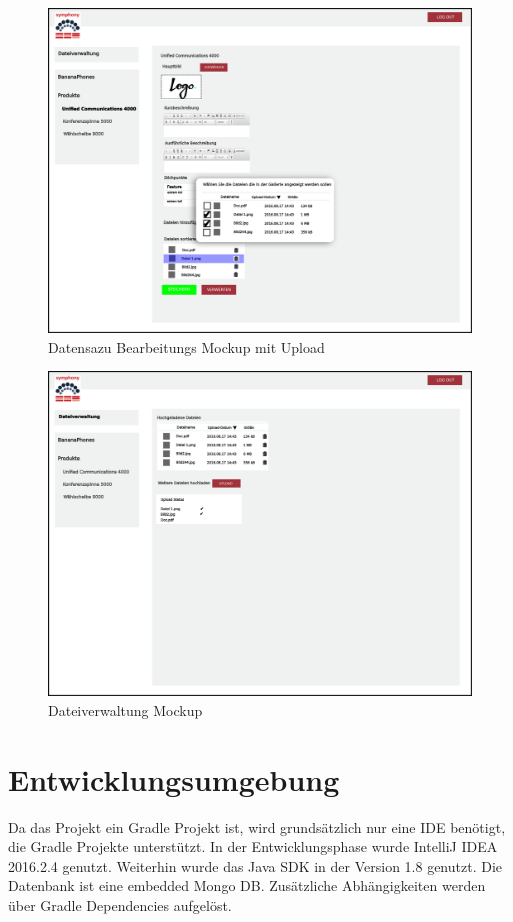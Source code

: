 \documentclass[a4paper,12pt]{article}
\begin{document}
\begin{figure}[!htb]
  \centering
     \includegraphics[width=1.0\textwidth]{projmicro_edit_dateiauswahl.png}
  \caption{Datensazu Bearbeitungs Mockup mit Upload}
  \label{fig:edit_file}
\end{figure}

\begin{figure}[!htb]
  \centering
     \includegraphics[width=1.0\textwidth]{projmicro_upload.png}
  \caption{Dateiverwaltung Mockup}
  \label{fig:selection}
\end{figure}

\section{Entwicklungsumgebung}
Da das Projekt ein Gradle Projekt ist, wird grundsätzlich nur eine IDE benötigt, die Gradle Projekte unterstützt. In der Entwicklungsphase wurde IntelliJ IDEA 2016.2.4 genutzt.
Weiterhin wurde das Java SDK in der Version 1.8 genutzt. Die Datenbank ist eine embedded Mongo DB. 
Zusätzliche Abhängigkeiten werden über Gradle Dependencies aufgelöst.

\clearpage


\end{document}
